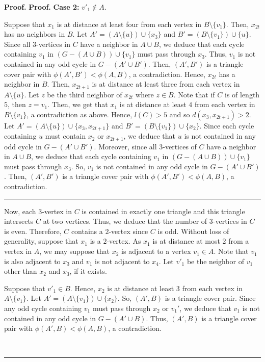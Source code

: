 \documentclass[10pt,a4paper]{amsart}
\newenvironment{proof}[1][Proof]{\textbf{#1.} }{\ \rule{0.5em}{0.5em}}
\begin{document}
\begin{proof}
\begin{proof}
\medskip
\noindent
\textbf{Case 2:} $v'_1\notin A$.

Suppose that $x_1$ is at distance at least four from each vertex in $B\setminus \{v_1\}$. Then, $x_{2t}$ has no neighbors in $B$. Let $A'=(A\setminus \{u\})\cup \{ x_3\}$ and $B'=(B\setminus \{v_1\})\cup \{u\}$. Since all $3$-vertices in $C$ have a neighbor in $A\cup B$, we deduce that each cycle containing $v_1$ in $(G- (A\cup B))\cup \{v_1\}$ must pass through $x_3$. Thus, $v_1$ is not contained in any odd cycle in $G- (A'\cup B')$. Then, $(A',B')$ is a triangle cover pair with $\phi(A',B')<\phi (A,B)$, a contradiction. Hence, $x_{2t}$ has a neighbor in $B$. Then, $x_{2t+1}$ is at distance at least three from each vertex in $A\setminus\{u\}$. Let $z$ be the third neighbor of $x_{2t}$ where $z\in B$. Note that if $C$ is of length $5$, then $z=v_1$. Then, we get that $x_1$ is at distance at least $4$ from each vertex in $B\setminus \{v_1\}$, a contradiction as above. Hence, $l(C) >5$ and so $d(x_3,x_{2t+1})>2$. Let $A'=(A\setminus\{u\})\cup \{x_3, x_{2t+1}\}$ and 
$B'=(B\setminus\{v_1\})\cup \{x_2\}$. Since each cycle containing $u$ must contain $x_2$ or $x_{2t+1}$, we deduce that $u$ is not contained in any odd cycle in $G-(A'\cup B')$. Moreover, since all $3$-vertices of $C$ have a neighbor in $A\cup B$, we deduce that each cycle containing $v_1$ in $(G- (A\cup B)) \cup \{v_1\}$ must pass through $x_3$. So, $v_1$ is not contained in any odd cycle in $G- (A'\cup B')$. Then, $(A',B')$ is a triangle cover pair with $\phi(A',B')<\phi (A,B)$, a contradiction. 
\end{proof}

Now, each $3$-vertex in $C$ is contained in exactly one triangle and this triangle intersects $C$ at two vertices. Thus, we deduce that the number of $3$-vertices in $C$ is even. Therefore, $C$ contains a $2$-vertex since $C$ is odd. Without loss of generality, suppose that $x_1$ is a $2$-vertex. As $x_1$ is at distance at most $2$ from a vertex in $A$, we may suppose that $x_2$ is adjacent to a vertex $v_1\in A$. Note that $v_1$ is also adjacent to $x_3$ and $v_1$ is not adjacent to $x_4$. Let $v'_1$ be the neighbor of $v_1$ other than $x_2$ and $x_3$, if it exists. 

Suppose that $v'_1\in B$. Hence, $x_2$ is at distance at least $3$ from each vertex in $A\setminus \{v_1\}$. Let $A'=(A\setminus \{v_1\})\cup \{x_2\}$. So, $(A',B)$ is a triangle cover pair. Since any odd cycle containing $v_1$ must pass through $x_2$ or $v_1'$, we deduce that $v_1$ is not contained in any odd cycle in $G-(A'\cup B)$. Thus, $(A',B)$ is a triangle cover pair with $\phi (A',B) < \phi (A,B)$, a contradiction.


\end{proof}
\end{document}
